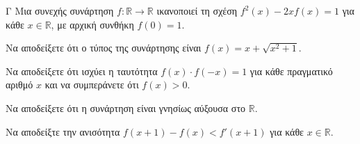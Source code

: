 \begin{thema}{Γ}
Μια συνεχής συνάρτηση $f: \mathbb{R} \to \mathbb{R}$ ικανοποιεί τη σχέση $f^2(x) - 2x f(x) = 1$ για κάθε $x \in \mathbb{R}$, με αρχική συνθήκη $f(0) = 1$.
\begin{erwthma}
  \item Να αποδείξετε ότι ο τύπος της συνάρτησης είναι $f(x) = x + \sqrt{x^2+1}$.
  \item Να αποδείξετε ότι ισχύει η ταυτότητα $f(x) \cdot f(-x) = 1$ για κάθε πραγματικό αριθμό $x$ και να συμπεράνετε ότι $f(x) > 0$.
  \item Να αποδείξετε ότι η συνάρτηση είναι γνησίως αύξουσα στο $\mathbb{R}$.
  \item Να αποδείξτε την ανισότητα $f(x+1) - f(x) < f'(x+1)$ για κάθε $x \in \mathbb{R}$. 
\end{erwthma}
\end{thema}
